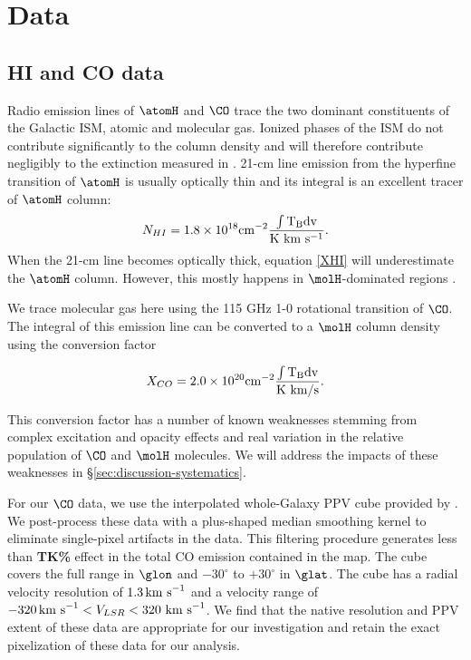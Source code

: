 \section{Data}
\label{sec:data}
\subsection{HI and CO data}

Radio emission lines of $\atomH$ and $\CO$ trace the two dominant constituents of the Galactic ISM, atomic and molecular gas. 
Ionized phases of the ISM do not contribute significantly to the column density and will therefore contribute negligibly to the extinction measured in \citet{Green_2015}. 
21-cm line emission from the hyperfine transition of $\atomH$ is usually optically thin and its integral is an excellent tracer of $\atomH$ column:
\begin{equation}\label{XHI}
N_{HI} = 1.8 \times 10^{18} \rm cm^{-2} \frac{ \int T_B dv}{\rm K~km~s^{-1}}.
\end{equation}
When the 21-cm line becomes optically thick, equation \ref{XHI} will underestimate the $\atomH$ column. 
However, this mostly happens in $\molH$-dominated regions \citep{Goldsmith_2007}.

We trace molecular gas here using the 115 GHz 1-0 rotational transition of $\CO$. 
The integral of this emission line can be converted to a $\molH$ column density using the conversion factor \citep{Bolatto_2013}

\begin{equation}\label{XCO}
X_{CO} = 2.0 \times 10^{20} \rm cm^{-2} \frac{ \int T_B dv}{\rm K~km/s}.
\end{equation}

This conversion factor has a number of known weaknesses stemming from complex excitation and opacity effects and real variation in the relative population of $\CO$ and $\molH$ molecules. 
We will address the impacts of these weaknesses in \S \ref{sec:discussion-systematics}. 

For our $\CO$ data, we use the interpolated whole-Galaxy PPV cube provided by \citet{Dame_2001}. 
We post-process these data with a plus-shaped median smoothing kernel to eliminate single-pixel artifacts in the data. 
This filtering procedure generates less than {\bf TK\%} effect in the total CO emission contained in the map. 
The cube covers the full range in $\glon$ and $-30^\circ$ to $+30^\circ$ in $\glat$. 
The cube has a radial velocity resolution of $1.3 {\rm \, km~s}^{-1}$ and a velocity range of $-320{\rm \,km~s} ^{-1} < V_{LSR} < 320 \rm{~km~s}^{-1}$. 
We find that the native resolution and PPV extent of these data are appropriate for our investigation and retain the exact pixelization of these data for our analysis. 

